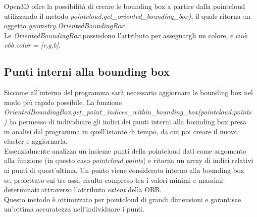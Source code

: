 \documentclass[italian]{report}
\begin{document}
Open3D offre la possibilità di creare le bounding box a partire dalla pointcloud utilizzando il metodo \textit{pointcloud.get\_oriented\_bounding\_box)}, il quale ritorna un oggetto
\textit{geometry.OrientedBoundingBox}.\\
Le \textit{OrientedBoundingBox} possiedono l'attributo per assegnargli un colore, e cioè \textit{obb.color = [r,g,b]}.
\subsection{Punti interni alla bounding box}
Siccome all'interno del programma sarà necessario aggiornare le bounding box nel modo più rapido possibile. La funzione\\ \textit{OrientedBoundingBox.get\_point\_indices\_within\_bounding\_box(pointcloud.points)} ha permesso di individuare gli indici dei punti interni alla bounding box presa in analisi dal programma in quell'istante di tempo, da cui poi creare il nuovo cluster e aggiornarla.\\ 
Essenzialmente analizza un insieme punti della pointcloud dati come argomento alla funzione (in questo caso \textit{pointcloud.points}) e ritorna un array di indici relativi ai punti di quest'ultima. Un punto viene considerato interno alla bounding box se, proiettato sui tre assi, risulta compreso tra i valori minimi e massimi determinati attraverso l'attributo \textit{extent} della OBB.\\
Questo metodo è ottimizzato per pointcloud di grandi dimensioni e garantisce un'ottima accuratezza nell'individuare i punti.
\end{document}
